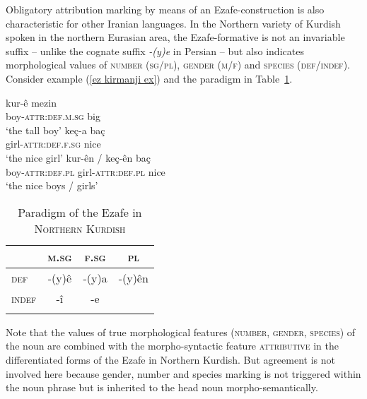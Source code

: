 Obligatory attribution marking by means of an Ezafe-construction is also characteristic for other Iranian languages. In the Northern variety of Kurdish spoken in the northern Eurasian area, the Ezafe-formative is not an invariable suffix – unlike the cognate suffix \textit{-(y)e} in Persian – but also indicates morphological values of \textsc{number} (\textsc{sg\slash{}pl}), \textsc{gender} (\textsc{m\slash{}f}) and \textsc{species} (\textsc{def\slash{}indef}). Consider example (\ref{ez kirmanji ex}) and the paradigm in Table~\ref{ez kirmanji paradigm}. 
\begin{exe}
\ex
\label{ez kirmanji ex}
\begin{xlist}
\ex
\gll	kur-\^e mezin\\
	boy-\textsc{attr:def.m.sg} big\\
\glt	‘the tall boy’
\ex	
\gll	ke\c{c}-a ba\c{c}\\
	girl-\textsc{attr:def.f.sg} nice\\
\glt	‘the nice girl’
\ex	
\gll	kur-\^en / ke\c{c}-\^en ba\c{c}\\
	boy-\textsc{attr:def.pl} {} girl-\textsc{attr:def.pl} nice\\
\glt	‘the nice boys / girls’
\end{xlist}
\end{exe}
\begin{table}
\begin{tabular}{lccc}
\lsptoprule
		&\textsc{m.sg}	&\textsc{f.sg}		&\textsc{pl}\\
\midrule
\textsc{def}	&-(y)\^{e}	&-(y)a			&-(y)\^{e}n\\
\textsc{indef}	&-î		&-e				&\\
\lspbottomrule
\end{tabular}
\caption[Paradigm of the Ezafe in \textsc{Northern Kurdish}]{Paradigm of the Ezafe in \textsc{Northern Kurdish} \citep{schroder2002}} 
\label{ez kirmanji paradigm}
\end{table}
Note that the values of true morphological features (\textsc{number, gender, species}) of the noun are combined with the morpho-syntactic feature \textsc{attributive} in the differentiated forms of the Ezafe in Northern Kurdish. But agreement is not involved here because gender, number and species marking is not triggered within the noun phrase but is inherited to the head noun morpho-semantically.

